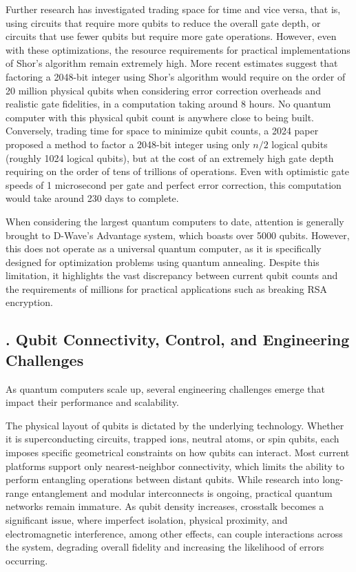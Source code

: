 \documentclass{elbioimp2}
\begin{document}
Further research has investigated trading space for time and vice versa, that is, using circuits that require more qubits to reduce the overall gate depth, or circuits that use fewer qubits but require more gate operations. However, even with these optimizations, the resource requirements for practical implementations of Shor's algorithm remain extremely high. More recent estimates suggest that factoring a 2048-bit integer using Shor's algorithm would require on the order of 20 million physical qubits when considering error correction overheads and realistic gate fidelities, in a computation taking around 8 hours\cite{Gidney_2021}. No quantum computer with this physical qubit count is anywhere close to being built. Conversely, trading time for space to minimize qubit counts, a 2024 paper proposed a method to factor a 2048-bit integer using only $n/2$ logical qubits (roughly 1024 logical qubits), but at the cost of an extremely high gate depth requiring on the order of tens of trillions of operations\cite{10.1007/978-3-032-01878-6_13}. Even with optimistic gate speeds of 1 microsecond per gate and perfect error correction, this computation would take around 230 days to complete.

When considering the largest quantum computers to date, attention is generally brought to D-Wave's Advantage system, which boasts over 5000 qubits\cite{NatureQC2023}. However, this does not operate as a universal quantum computer, as it is specifically designed for optimization problems using quantum annealing. Despite this limitation, it highlights the vast discrepancy between current qubit counts and the requirements of millions for practical applications such as breaking RSA encryption.


\subsection{. Qubit Connectivity, Control, and Engineering Challenges}


As quantum computers scale up, several engineering challenges emerge that impact their performance and scalability.

The physical layout of qubits is dictated by the underlying technology. Whether it is superconducting circuits, trapped ions, neutral atoms, or spin qubits, each imposes specific geometrical constraints on how qubits can interact. Most current platforms support only nearest-neighbor connectivity, which limits the ability to perform entangling operations between distant qubits. While research into long-range entanglement and modular interconnects is ongoing, practical quantum networks remain immature. As qubit density increases, crosstalk becomes a significant issue, where imperfect isolation, physical proximity, and electromagnetic interference, among other effects, can couple interactions across the system, degrading overall fidelity and increasing the likelihood of errors occurring.
\end{document}
